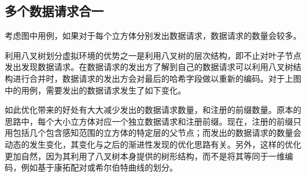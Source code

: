 \subsection*{多个数据请求合一}
\label{MultiLevelOptimizationSection}
\par
考虑图中用例，如果对于每个立方体分别发出数据请求，数据请求的数量会较多。
\par
利用八叉树划分虚拟环境的优势之一是利用八叉树的层次结构，即不止对叶子节点发出发现数据请求。在数据请求的发出方了解到自己的数据请求可以利用八叉树结构进行合并时，数据请求的发出方会对最后的哈希字段做以重新的编码。对于上图中的用例，需要发出的数据请求发生了如下变化。
\par
如此优化带来的好处有大大减少发出的数据请求数量，和注册的前缀数量。原本的思路中，每个大小立方体对应一个独立数据请求和注册前缀。现在，注册的前缀只用包括几个包含感知范围的立方体的特定层的父节点；而发出的数据请求的数量会动态的发生变化，其变化与之后的渐进性发现的优化思路有关。另外，这样的优化更加自然，因为其利用了八叉树本身提供的树形结构，而不是将其等同于一维编码，例如基于康拓配对或希尔伯特曲线的划分。
\par
